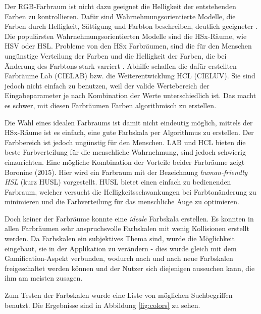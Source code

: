 \documentclass[12pt,twoside]{book}
\begin{document}
Der RGB-Farbraum ist nicht dazu geeignet die Helligkeit der entstehenden Farben zu kontrollieren. Dafür sind Wahrnehmungsorientierte Modelle, die Farben durch Helligkeit, Sättigung und Farbton beschreiben, deutlich geeigneter \cite{meier2004interactive}. Die populärsten Wahrnehmungsorientierten Modelle sind die HSx-Räume, wie HSV oder HSL.
Probleme von den HSx Farbräumen, sind die für den Menschen ungünstige Verteilung der Farben und die Helligkeit der Farben, die bei Änderung des Farbtons stark varriert \cite{husl}.
Abhilfe schaffen die dafür erstellten Farbräume Lab (CIELAB) bzw. die Weiterentwicklung HCL (CIELUV). Sie sind jedoch nicht einfach zu benutzen, weil der valide Wertebereich der Eingabeparameter je nach Kombination der Werte unterschiedlich ist. Das macht es schwer, mit diesen Farbräumen Farben algorithmisch zu erstellen.

Die Wahl eines idealen Farbraums ist damit nicht eindeutig möglich, mittels der HSx-Räume ist es einfach, eine gute Farbskala per Algorithmus zu erstellen. Der Farbbereich ist jedoch ungünstig für den Menschen. LAB und HCL bieten die beste Farbverteilung für die menschliche Wahrnehmung, sind jedoch schwierig einzurichten. Eine mögliche Kombination der Vorteile beider Farbräume zeigt Boronine (2015). Hier wird ein Farbraum mit der Bezeichnung \textit{human-friendly HSL} (kurz HUSL) vorgestellt. HUSL bietet einen einfach zu bedienenden Farbraum, welcher versucht die Helligkeitsschwankungen bei Farbtonänderung zu minimieren und die Farbverteilung für das menschliche Auge zu optimieren.

Doch keiner der Farbräume konnte eine \textit{ideale} Farbskala erstellen. Es konnten in allen Farbräumen sehr anspruchsvolle Farbskalen mit wenig Kollisionen erstellt werden. Da Farbskalen ein subjektives Thema sind, wurde die Möglichkeit eingebaut, sie in der Applikation zu verändern - dies wurde gleich mit dem Gamification-Aspekt verbunden, wodurch nach und nach neue Farbskalen freigeschaltet werden können und der Nutzer sich diejenigen aussuchen kann, die ihm am meisten zusagen.

Zum Testen der Farbskalen wurde eine Liste von möglichen Suchbegriffen benutzt. Die Ergebnisse sind in Abbildung \ref{fig:colors} zu sehen.
\end{document}
